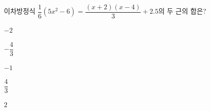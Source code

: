 이차방정식 $\dfrac{1}{6}(5x^2-6)=\dfrac{(x+2)(x-4)}{3}+2.5$의 두 근의 합은?
\begin{choices32}{\rule[-3ex]{0pt}{8ex}$-2$}{\rule[-3ex]{0pt}{8ex}$-\dfrac{4}{3}$}{\rule[-3ex]{0pt}{8ex}$-1$}{\rule[-3ex]{0pt}{8ex}$\dfrac{4}{3}$}{\rule[-3ex]{0pt}{8ex}$2$}\end{choices32}
